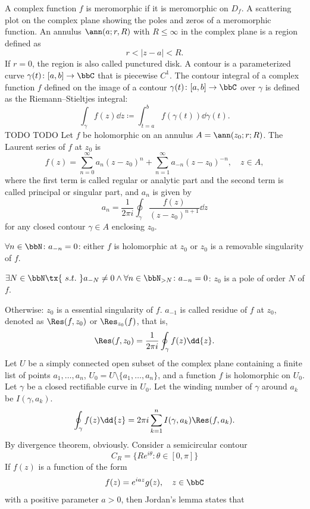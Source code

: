 \documentclass[a4paper,12pt]{article}
\begin{document}
A complex function $f$ is meromorphic if it is meromorphic on $D_f$.
A scattering plot on the complex plane showing the poles and zeros of a meromorphic function.
An annulus $\ann(a; r, R)$ with $R\leq\infty$ in the complex plane is a region defined as 
\[r<|z-a|<R.\]
If $r=0$, the region is also called punctured disk.
A contour is a parameterized curve $\gamma(t)\colon[a,b]\to\bbC$ that is piecewise $C^1$.
The contour integral of a complex function $f$ defined on the image of a contour $\gamma(t)\colon[a,b]\to\bbC$ over $\gamma$ is defined as the Riemann–Stieltjes integral:
\[\int_{\gamma}f(z)\dd{z}\coloneq\int_{t=a}^bf(\gamma(t))\dd{\gamma(t)}.\]
TODO
TODO
Let $f$ be holomorphic on an annulus $A=\ann(z_0; r; R)$. The Laurent series of $f$ at $z_0$ is
\[f(z)=\sum_{n=0}^{\infty}a_n(z-z_0)^n+\sum_{n=1}^{\infty}a_{-n}(z-z_0)^{-n},\quad z\in A,\]
where the first term is called regular or analytic part and the second term is called principal or singular part, and $a_n$ is given by
\[a_n=\frac{1}{2\pi i}\oint_{\gamma}\frac{f(z)}{(z-z_0)^{n+1}}\dd{z}\]
for any closed contour $\gamma\in A$ enclosing $z_0$.
\bit
\item $\forall n\in\bbN\colon a_{-n}=0$: either $f$ is holomorphic at $z_0$ or $z_0$ is a removable singularity of $f$.
\item $\exists N\in\bbN\tx{\ s.t.\ }a_{-N}\neq 0\land\forall n\in\bbN_{>N}\colon a_{-n}=0$: $z_0$ is a pole of order $N$ of $f$.
\item Otherwise: $z_0$ is a essential singularity of $f$.
\eit
$a_{-1}$ is called residue of $f$ at $z_0$, denoted as $\Res(f,z_0)$ or $\Res_{z_0}(f)$, that is,
\[\Res(f,z_0)=\frac{1}{2\pi i}\oint_{\gamma}f(z)\dd{z}.\]
Let $U$ be a simply connected open subset of the complex plane containing a finite list of points $a_1,\ldots,a_n$, $U_0=U\setminus\{a_1,\ldots,a_n\}$, and a function $f$ is holomorphic on $U_0$. Let $\gamma$ be a closed rectifiable curve in $U_0$. Let the winding number of $\gamma$ around $a_k$ be $I(\gamma,a_k)$.
\[\oint_{\gamma}f(z)\dd{z}=2\pi i\sum_{k=1}^nI(\gamma,a_k)\Res(f,a_k).\]
\bpr
By divergence theorem, obviously.
\epr
{}
Consider a semicircular contour
\[C_R=\{Re^{i\theta}\colon\theta\in[0,\pi]\}\]
If $f(z)$ is a function of the form
\[f(z)=e^{iaz}g(z),\quad z\in\bbC\]
with a positive parameter $a>0$, then Jordan's lemma states that
\end{document}
